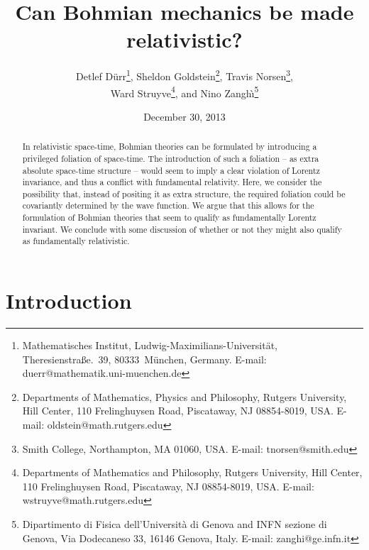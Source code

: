 \documentclass[12pt]{article}
\date{December 30, 2013}
\begin{document}
\title{Can  Bohmian mechanics be made relativistic?}

\author{
Detlef D\"urr\footnote{Mathematisches Institut, Ludwig-Maximilians-Universit\"at, 
	Theresienstra{\ss}e.~39, 80333~M\"unchen, Germany. E-mail: duerr@mathematik.uni-muenchen.de},
Sheldon Goldstein\footnote{Departments of Mathematics, Physics and
     Philosophy, Rutgers University, Hill Center,  
     110 Frelinghuysen Road, Piscataway, NJ 08854-8019, USA.
     E-mail: oldstein@math.rutgers.edu},
Travis Norsen\footnote{Smith College, Northampton, MA 01060, USA. E-mail: tnorsen@smith.edu},\\
Ward Struyve\footnote{Departments of Mathematics and Philosophy,
     Rutgers University, Hill Center,  
     110 Frelinghuysen Road, Piscataway, NJ 08854-8019, USA.
     E-mail: wstruyve@math.rutgers.edu},
and Nino Zangh\`\i\footnote{Dipartimento di Fisica dell'Universit\`a
     di Genova and INFN sezione di Genova, Via Dodecaneso 33, 16146
     Genova, Italy. E-mail: zanghi@ge.infn.it}
}

\maketitle

\begin{abstract}
\noindent
In relativistic space-time, Bohmian theories can be formulated by
introducing a privileged foliation of space-time. The introduction of
such a foliation -- as extra absolute space-time structure -- would seem
to imply a clear violation of Lorentz invariance, and thus a conflict
with fundamental relativity. Here, we consider the possibility that,
instead of positing it as extra structure, the required foliation
could be covariantly determined by the wave function. We argue that this
allows for the formulation of Bohmian theories that seem to qualify as
fundamentally Lorentz invariant. We conclude with some discussion of
whether or not they might also qualify as fundamentally relativistic.
\end{abstract}





\renewcommand{\baselinestretch}{1.1}



\section{Introduction}
\label{sec1}
\end{document}
